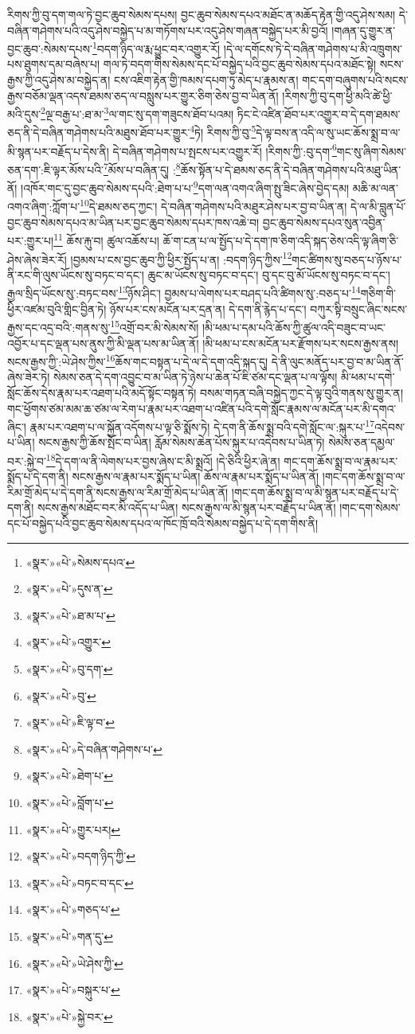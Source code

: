 རིགས་ཀྱི་བུ་དག་གལ་ཏེ་བྱང་ཆུབ་སེམས་དཔས། བྱང་ཆུབ་སེམས་དཔའ་མཐོང་ན་མཆོད་རྟེན་གྱི་འདུ་ཤེས་སམ། དེ་བཞིན་གཤེགས་པའི་འདུ་ཤེས་བསྐྱེད་པ་མ་གཏོགས་པར་འདུ་ཤེས་གཞན་བསྐྱེད་པར་མི་བྱའོ། །གཞན་དུ་གྱུར་ན་བྱང་ཆུབ་:སེམས་དཔས་\footnote{«སྣར་»«པེ་»སེམས་དཔའ་}བདག་ཉིད་ལ་རྨ་ཕྱུང་བར་འགྱུར་རོ། །དེ་ལ་དགོངས་ཏེ་དེ་བཞིན་གཤེགས་པ་མི་འཁྲུགས་པས་ཐུགས་དམ་བཞེས་པ། གལ་ཏེ་བདག་གིས་སེམས་དང་པོ་བསྐྱེད་པའི་བྱང་ཆུབ་སེམས་དཔའ་མཐོང་སྟེ། སངས་རྒྱས་ཀྱི་འདུ་ཤེས་མ་བསྐྱེད་ན། ངས་འཇིག་རྟེན་གྱི་ཁམས་དཔག་ཏུ་མེད་པ་རྣམས་ན། གང་དག་བཞུགས་པའི་སངས་རྒྱས་བཅོམ་ལྡན་འདས་ཐམས་ཅད་ལ་བསླུས་པར་གྱུར་ཅིག་ཅེས་བྱ་བ་ཡིན་ནོ། །རིགས་ཀྱི་བུ་དག་ཕྱི་མའི་ཚེ་ཕྱི་མའི་དུས་\footnote{«སྣར་»«པེ་»དུས་ན་}ལྔ་བརྒྱ་པ་:ཐ་མ་\footnote{«སྣར་»«པེ་»ཐ་མ་པ་}ལ་གང་སུ་དག་གཟུངས་ཐོབ་པའམ། ཏིང་ངེ་འཛིན་ཐོབ་པར་འགྱུར་བ་དེ་དག་ཐམས་ཅད་ནི་དེ་བཞིན་གཤེགས་པའི་མཐུས་ཐོབ་པར་གྱུར་\footnote{«སྣར་»«པེ་»འགྱུར་}ཏེ། རིགས་ཀྱི་བུ་\footnote{«སྣར་»«པེ་»བུ་དག་}དེ་ལྟ་བས་ན་འདི་ལ་སུ་ཡང་ཆོས་སྨྲ་བ་ལ་མི་སྙན་པར་བརྗོད་པ་དེས་ནི། དེ་བཞིན་གཤེགས་པ་སྤངས་པར་འགྱུར་རོ། །རིགས་ཀྱི་:བུ་དག་\footnote{«སྣར་»«པེ་»བུ་}གང་སུ་ཞིག་སེམས་ཅན་དག་:ཇི་ལྟར་མོས་པའི་\footnote{«སྣར་»«པེ་»ཇི་ལྟ་བ་}མོས་པ་བཞིན་དུ། :\footnote{«སྣར་»«པེ་»དེ་བཞིན་གཤེགས་པ་}ཆོས་སྟོན་པ་དེ་ཐམས་ཅད་ནི་དེ་བཞིན་གཤེགས་པའི་མཐུ་ཡིན་ནོ། །འཁོར་གང་དུ་བྱང་ཆུབ་སེམས་དཔའི་:ཐེག་པ་པ་\footnote{«སྣར་»«པེ་»ཐེག་པ་}དག་ལན་འགའ་ཞིག་སྤུ་ཟིང་ཞེས་བྱེད་དམ། མཆི་མ་ལན་འགའ་ཞིག་:ཀློག་པ་\footnote{«སྣར་»«པེ་»བློག་པ་}དེ་ཐམས་ཅད་ཀྱང་། དེ་བཞིན་གཤེགས་པའི་མཐུར་ཤེས་པར་བྱ་བ་ཡིན་ན། དེ་ལ་མི་བླུན་པོ་བྱང་ཆུབ་སེམས་དཔའ་མ་ཡིན་པར་བྱང་ཆུབ་སེམས་དཔར་ཁས་འཆེ་བ། བྱང་ཆུབ་སེམས་དཔའ་སུན་འབྱིན་པར་:གྱུར་པ།\footnote{«སྣར་»«པེ་»གྱུར་པར།} ཆོས་རྐུ་བ། ཚུལ་འཆོས་པ། ཆོ་ག་ངན་པ་ལ་སྤྱོད་པ་དེ་དག་ཁ་ཅིག་འདི་སྐད་ཅེས་འདི་ལྟ་ཞིག་ཅི་ཤེས་ཞེས་ཟེར་རོ། །བྱམས་པ་ངས་བྱང་ཆུབ་ཀྱི་ཕྱིར་སྤྱོད་པ་ན། :བདག་ཉིད་ཀྱིས་\footnote{«སྣར་»«པེ་»བདག་ཉིད་ཀྱི་}གང་ཚིགས་སུ་བཅད་པ་ཉོས་པ་ནི་རང་གི་ལུས་ཡོངས་སུ་བཏང་བ་དང་། ཆུང་མ་ཡོངས་སུ་བཏང་བ་དང་། བུ་དང་བུ་མོ་ཡོངས་སུ་བཏང་བ་དང་། རྒྱལ་སྲིད་ཡོངས་སུ་:བཏང་བས་\footnote{«སྣར་»«པེ་»བཏང་བ་དང་}ཉོས་ཤིང་། བྱམས་པ་ལེགས་པར་བཤད་པའི་ཚིགས་སུ་:བཅད་པ་\footnote{«སྣར་»«པེ་»གཅད་པ་}གཅིག་གི་ཕྱིར་འཛམ་བུའི་གླིང་བྱིན་ཏེ། ཉོས་པར་ངས་མངོན་པར་དྲན་ན། དེ་དག་ནི་རྙེད་པ་དང་། བཀུར་སྟི་བསྲུང་ཞིང་སངས་རྒྱས་དང་འདྲ་བའི་:གནས་སུ་\footnote{«སྣར་»«པེ་»གན་དུ་}འགྲོ་བར་མི་སེམས་སོ། །མི་ཕམ་པ་དམ་པའི་ཆོས་ཀྱི་ཚུལ་འདི་བཟུང་བ་ཡང་འབྱོར་པ་དང་ལྡན་པས་ནུས་ཀྱི་མི་ལྡན་པས་མ་ཡིན་ནོ། །མི་ཕམ་པ་ངས་མངོན་པར་རྫོགས་པར་སངས་རྒྱས་ནས། སངས་རྒྱས་ཀྱི་:ཡེ་ཤེས་ཀྱིས་\footnote{«སྣར་»«པེ་»ཡེ་ཤེས་ཀྱི་}ཆོས་གང་བསྟན་པ་དེ་ལ་དེ་དག་འདི་སྐད་དུ། དེ་ནི་ལུང་མནོད་པར་བྱ་བ་མ་ཡིན་ནོ་ཞེས་ཟེར་ཏེ། སེམས་ཅན་དེ་དག་འབྱུང་བ་མ་ཡིན་ཏེ་ཉེས་པ་ཆེན་པོ་ཇི་ཙམ་དང་ལྡན་པ་ལ་ལྟོས། མི་ཕམ་པ་དགེ་སློང་ཆོས་དེས་རྣམ་པར་འཐག་པའི་མདོ་སྟོང་བསྟན་ཏེ། བསམ་གཏན་བཞི་བསྐྱེད་ཀྱང་དེ་ལྟ་བུའི་གནས་སུ་གྱུར་ན། གང་ཕྱོགས་ཙམ་མམ་ཆ་ཙམ་ལ་རེག་པ་རྣམ་པར་འཐག་པ་འཛིན་པའི་དགེ་སློང་རྣམས་ལ་མངོན་པར་མི་དགའ་ཞིང་། རྣམ་པར་འཐག་པ་ལ་སྐྱོན་འདོགས་པ་ལྟ་ཅི་སྨོས་ཏེ། དེ་དག་ནི་ཆོས་སྨྲ་བའི་དགེ་སློང་ལ་:སྐུར་པ་\footnote{«སྣར་»«པེ་»བསྐུར་པ་}འདེབས་པ་ཡིན། སངས་རྒྱས་ཀྱི་ཆོས་སྤོང་བ་ཡིན། རློམ་སེམས་ཆེན་པོས་སྐུར་པ་འདེབས་པ་ཡིན་ཏེ། སེམས་ཅན་དམྱལ་བར་:སྐྱེ་བ་\footnote{«སྣར་»«པེ་»སྐྱེ་བར་}དེ་དག་ལ་ནི་ལེགས་པར་བྱས་ཞེས་ང་མི་སྨྲའོ། །དེ་ཅིའི་ཕྱིར་ཞེ་ན། གང་དག་ཆོས་སྨྲ་བ་ལ་རྣམ་པར་སྨོད་པ་དེ་དག་ནི། སངས་རྒྱས་ལ་རྣམ་པར་སྨོད་པ་ཡིན། ཆོས་ལ་རྣམ་པར་སྨོད་པ་ཡིན་ནོ། །གང་དག་ཆོས་སྨྲ་བ་ལ་རིམ་གྲོ་མེད་པ་དེ་དག་ནི་སངས་རྒྱས་ལ་རིམ་གྲོ་མེད་པ་ཡིན་ནོ། །གང་དག་ཆོས་སྨྲ་བ་ལ་མི་སྙན་པར་བརྗོད་པ་དེ་དག་ནི། སངས་རྒྱས་མཐོང་བར་མི་འདོད་པ་ཡིན། སངས་རྒྱས་ལ་མི་སྙན་པར་བརྗོད་པ་ཡིན་ནོ། །གང་དག་སེམས་དང་པོ་བསྐྱེད་པའི་བྱང་ཆུབ་སེམས་དཔའ་ལ་ཁོང་ཁྲོ་བའི་སེམས་བསྐྱེད་པ་དེ་དག་གིས་ནི། 